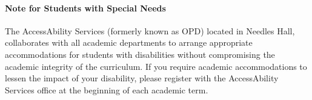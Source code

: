 \documentclass[letterpaper,10pt]{article}
\begin{document}
\paragraph{Note for Students with Special Needs}
The AccessAbility Services (formerly known as OPD) located in Needles Hall, collaborates with all academic departments to arrange appropriate accommodations for students with disabilities without compromising the academic integrity of the curriculum. If you require academic accommodations to lessen the impact of your disability, please register with the AccessAbility Services office at the beginning of each academic term.
\end{document}
